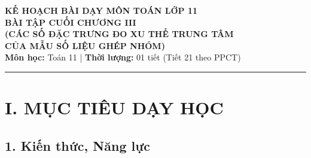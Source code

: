\documentclass[12pt, a4paper]{article}
\begin{document}
\begin{center}
    {\Large \textbf{KẾ HOẠCH BÀI DẠY MÔN TOÁN LỚP 11}}\\[0.4em]
    {\LARGE \textbf{BÀI TẬP CUỐI CHƯƠNG III}}\\[0.3em]
    {\large \textbf{(CÁC SỐ ĐẶC TRƯNG ĐO XU THẾ TRUNG TÂM}}\\[0.2em]
    {\large \textbf{CỦA MẪU SỐ LIỆU GHÉP NHÓM)}}\\[0.5em]
    \textbf{Môn học:} Toán 11 | \textbf{Thời lượng:} 01 tiết (Tiết 21 theo PPCT)
\end{center}

\vspace{0.5em}
\hrule
\vspace{1em}

\section*{I. MỤC TIÊU DẠY HỌC}

\subsection*{1. Kiến thức, Năng lực}
\end{document}
